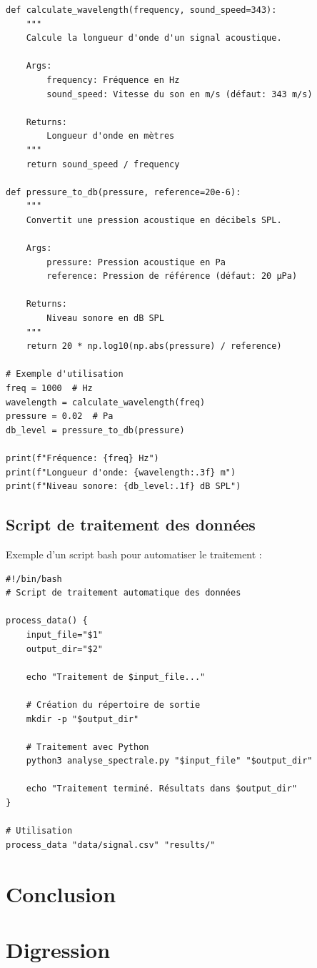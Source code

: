 \begin{verbatim}
def calculate_wavelength(frequency, sound_speed=343):
    """
    Calcule la longueur d'onde d'un signal acoustique.
    
    Args:
        frequency: Fréquence en Hz
        sound_speed: Vitesse du son en m/s (défaut: 343 m/s)
    
    Returns:
        Longueur d'onde en mètres
    """
    return sound_speed / frequency

def pressure_to_db(pressure, reference=20e-6):
    """
    Convertit une pression acoustique en décibels SPL.
    
    Args:
        pressure: Pression acoustique en Pa
        reference: Pression de référence (défaut: 20 µPa)
    
    Returns:
        Niveau sonore en dB SPL
    """
    return 20 * np.log10(np.abs(pressure) / reference)

# Exemple d'utilisation
freq = 1000  # Hz
wavelength = calculate_wavelength(freq)
pressure = 0.02  # Pa
db_level = pressure_to_db(pressure)

print(f"Fréquence: {freq} Hz")
print(f"Longueur d'onde: {wavelength:.3f} m")
print(f"Niveau sonore: {db_level:.1f} dB SPL")
\end{verbatim}

\subsection{Script de traitement des données}

Exemple d'un script bash pour automatiser le traitement :

\begin{verbatim}
#!/bin/bash
# Script de traitement automatique des données

process_data() {
    input_file="$1"
    output_dir="$2"
    
    echo "Traitement de $input_file..."
    
    # Création du répertoire de sortie
    mkdir -p "$output_dir"
    
    # Traitement avec Python
    python3 analyse_spectrale.py "$input_file" "$output_dir"
    
    echo "Traitement terminé. Résultats dans $output_dir"
}

# Utilisation
process_data "data/signal.csv" "results/"
\end{verbatim}


\section*{Conclusion}

\section*{Digression}
